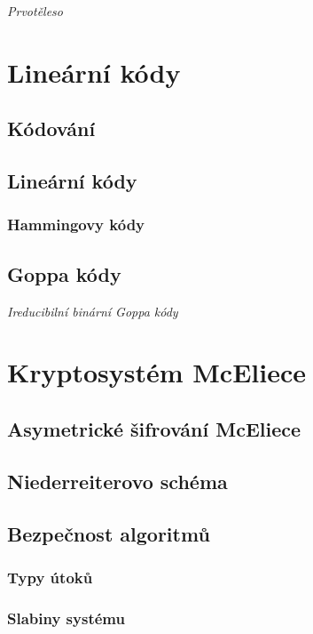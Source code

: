 \documentclass[thesis=M,czech,hidelinks]{FITthesis}[2012/06/26]
\begin{document}
\emph{Prvotěleso}


\chapter{Lineární kódy}\label{kap_kody}

\section{Kódování}

\section{Lineární kódy}
\subsection{Hammingovy kódy}

\section{Goppa kódy}
\emph{Ireducibilní binární Goppa kódy}




\chapter{Kryptosystém McEliece}\label{kap_mceliece}

\section{Asymetrické šifrování McEliece}

\section{Niederreiterovo schéma}

\section{Bezpečnost algoritmů}
\subsection{Typy útoků}
\subsection{Slabiny systému}
\end{document}
